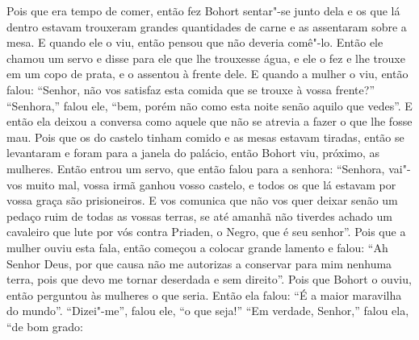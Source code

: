 Pois que era tempo de comer, então fez Bohort sentar"-se junto dela e os que lá
dentro estavam trouxeram grandes quantidades de carne e as assentaram sobre a
mesa. E quando ele o viu, então pensou que não deveria comê"-lo. Então ele
chamou um servo e disse para ele que lhe trouxesse água, e ele o fez e lhe
trouxe em um copo de prata, e o assentou à frente dele. E quando a mulher o
viu, então falou: “Senhor, não vos satisfaz esta comida que se trouxe à vossa
frente?” “Senhora,” falou ele, “bem, porém não como esta noite senão aquilo
que vedes”. E então ela deixou a conversa como aquele que não se atrevia a
fazer o que lhe fosse mau. Pois que os do castelo tinham comido e as mesas
estavam tiradas, então se levantaram e foram para a janela do palácio, então
Bohort viu, próximo, as mulheres. Então entrou um servo, que então falou para a
senhora: “Senhora, vai"-vos muito mal, vossa irmã ganhou vosso castelo, e todos
os que lá estavam por vossa graça são prisioneiros. E vos comunica que não vos
quer deixar senão um pedaço ruim de todas as vossas terras, se até amanhã não tiverdes
achado um cavaleiro que lute por vós contra Priaden, o Negro, que é seu
senhor”. Pois que a mulher ouviu esta fala, então começou a colocar grande
lamento e falou: “Ah Senhor Deus, por que causa não me autorizas a conservar
para mim nenhuma terra, pois que devo me tornar deserdada e sem direito”. Pois
que Bohort o ouviu, então perguntou às mulheres o que seria. Então ela falou:
“É a maior maravilha do mundo”. “Dizei"-me”, falou ele, “o que seja!” “Em
verdade, Senhor,” falou ela, “de bom grado:

